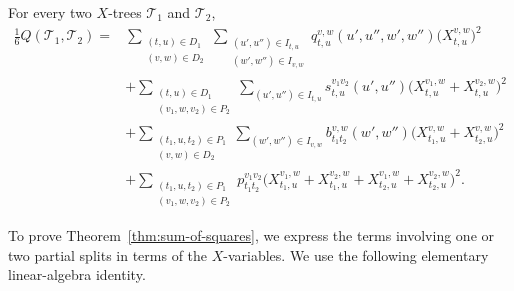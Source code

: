 \documentclass[12pt]{article}
\begin{document}
\begin{theorem}\label{thm:sum-of-squares}
For every two $X$-trees $\mathcal T_1$ and $\mathcal T_2$,
\begin{equation}\label{eq:sos-decomposition}
\begin{aligned}
\frac16Q(\mathcal T_1,\mathcal T_2)
={}&\sum_{\substack{(t,u)\in D_1\\(v,w)\in D_2}}
\sum_{\substack{(u',u'')\in I_{t,u}\\(w',w'')\in I_{v,w}}}
q_{t,u}^{v,w}(u',u'',w',w'')\bigl(X_{t,u}^{v,w}\bigr)^2\\
&+\sum_{\substack{(t,u)\in D_1\\(v_1,w,v_2)\in P_2}}
\sum_{(u',u'')\in I_{t,u}}
s_{t,u}^{v_1v_2}(u',u'')
\bigl(X_{t,u}^{v_1,w}+X_{t,u}^{v_2,w}\bigr)^2\\
&+\sum_{\substack{(t_1,u,t_2)\in P_1\\(v,w)\in D_2}}
\sum_{(w',w'')\in I_{v,w}}
b_{t_1t_2}^{v,w}(w',w'')
\bigl(X_{t_1,u}^{v,w}+X_{t_2,u}^{v,w}\bigr)^2\\
&+\sum_{\substack{(t_1,u,t_2)\in P_1\\(v_1,w,v_2)\in P_2}}
p_{t_1t_2}^{v_1v_2}
\bigl(X_{t_1,u}^{v_1,w}+X_{t_1,u}^{v_2,w}
+X_{t_2,u}^{v_1,w}+X_{t_2,u}^{v_2,w}\bigr)^2.
\end{aligned}
\end{equation}
\end{theorem}

To prove Theorem~\ref{thm:sum-of-squares}, we express the terms involving
one or two partial splits in terms of the $X$-variables.  We use the
following elementary linear-algebra identity.
\end{document}
